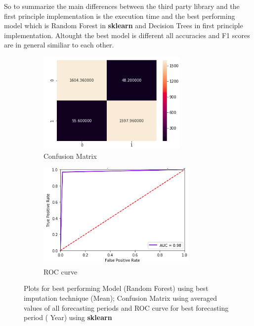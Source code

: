\noindent So to summarize the main differences between the third party library and the first principle implementation is the execution time and the best performing model which is Random Forest in \textbf{sklearn} and Decision Trees in first principle implementation. Altought the best model is different all accuracies and F1 scores are in general similiar to each other. 
\begin{figure}[H]
\centering
  \begin{subfigure}[b]{0.5\textwidth}
    \includegraphics[scale = .7]{imgs/confusion_matrix_2.png}
    \caption{Confusion Matrix}
  \label{fig:confusion_matrix_skl}
  \end{subfigure}
  \begin{subfigure}[b]{0.4\textwidth}
    \includegraphics[scale = .9]{imgs/rf_mean_imp_yr1_skl.png}
  \caption{ROC curve}
  \label{fig:roc_skl}
  \end{subfigure}
  \caption{Plots for best performing Model (Random Forest) using best imputation technique (Mean); Confusion Matrix using averaged values of all forecasting periods and ROC curve for best forecasting period ( Year) using \textbf{sklearn}}
  \label{fig:pp_plots_results_skl}
\end{figure}


